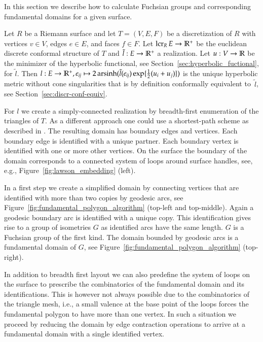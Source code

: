 \documentclass[Thesis]{subfiles}
\begin{document}
In this section we describe how to calculate Fuchsian groups and corresponding fundamental domains for a given surface.

Let $R$ be a Riemann surface and let $T=(V, E, F)$ be a discretization of $R$ with vertices $v\in V$, edges $e\in E$, and faces $f\in F$. Let $\operatorname{lcr}_R E\to \mathbb R^+$ be the euclidean discrete conformal structure of $T$ and $\tilde l:E\to \mathbb R^+$ a realization. Let $u:V\to \mathbb R$ be the minimizer of the hyperbolic functional, see Section~\ref{sec:hyperbolic_fuctional}, for $\tilde l$. Then $l:E \to \mathbb R^+, e_{\it ij}\mapsto 2\operatorname{arsinh}(\tilde l(e_{\it ij})\exp\{\frac{1}{2}(u_i+u_j)\})$ is the unique hyperbolic metric without cone singularities that is by definition conformally equivalent to~$\tilde l$, see Section~\ref{sec:discr-conf-equiv}.

For $l$ we create a simply-connected realization by breadth-first enumeration of the triangles of $T$. As a different approach one could use a shortest-path scheme as described in \cite{EricksonH02}.  The resulting domain has boundary edges and vertices. Each boundary edge is identified with a unique partner. Each boundary vertex is identified with one or more other vertices. On the surface the boundary of the domain corresponds to a connected system of loops around surface handles, see, e.g., Figure~\ref{fig:lawson_embedding} (left).

In a first step we create a simplified domain by connecting vertices that are identified with more than two copies by geodesic arcs, see Figure~\ref{fig:fundamental_polygon_algorithm} (top-left and top-middle). Again a geodesic boundary arc is identified with a unique copy. This identification gives rise to a group of isometries $G$ as identified arcs have the same length. $G$ is a Fuchsian group of the first kind. The domain bounded by geodesic arcs is a fundamental domain of $G$, see Figure~\ref{fig:fundamental_polygon_algorithm} (top-right).

In addition to breadth first layout we can also predefine the system of loops on the surface to prescribe the combinatorics of the fundamental domain and its identifications. This is however not always possible due to the combinatorics of the triangle mesh, i.e., a small valence at the base point of the loops forces the fundamental polygon to have more than one vertex. In such a situation we proceed by reducing the domain by edge contraction operations to arrive at a fundamental domain with a single identified vertex.
\end{document}
